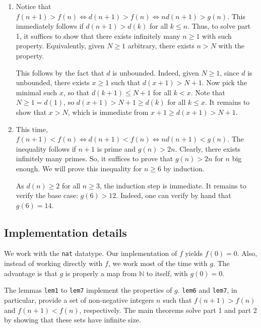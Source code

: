 \documentclass{article}
\newcommand{\N}{\mathbb{N}}
\begin{document}
\begin{enumerate}

\item
Notice that $f(n + 1) > f(n) \iff d(n + 1) > f(n) \iff n d(n + 1) > g(n)$.
This immediately follows if $d(n + 1) > d(k)$ for all $k \leq n$.
Thus, to solve part 1, it suffices to show that there exists infinitely many $n \geq 1$ with such property.
Equivalently, given $N \geq 1$ arbitrary, there exists $n > N$ with the property.

This follows by the fact that $d$ is unbounded.
Indeed, given $N \geq 1$, since $d$ is unbounded, there exists $x \geq 1$ such that $d(x + 1) > N + 1$.
Now pick the minimal such $x$, so that $d(k + 1) \leq N + 1$ for all $k < x$.
Note that $N \geq 1 = d(1)$, so $d(x + 1) > N + 1 \geq d(k)$ for all $k \leq x$.
It remains to show that $x > N$, which is immediate from $x + 1 \geq d(x + 1) > N + 1$.

\item
This time, $f(n + 1) < f(n) \iff d(n + 1) < f(n) \iff n d(n + 1) < g(n)$.
The inequality follows if $n + 1$ is prime and $g(n) > 2n$.
Clearly, there exists infinitely many primes.
So, it suffices to prove that $g(n) > 2n$ for $n$ big enough.
We will prove this inequality for $n \geq 6$ by induction.

As $d(n) \geq 2$ for all $n \geq 3$, the induction step is immediate.
It remains to verify the base case: $g(6) > 12$.
Indeed, one can verify by hand that $g(6) = 14$.

\end{enumerate}



\subsection*{Implementation details}

We work with the \texttt{nat} datatype.
Our implementation of $f$ yields $f(0) = 0$.
Also, instead of working directly with $f$, we work most of the time with $g$.
The advantage is that $g$ is properly a map from $\N$ to itself, with $g(0) = 0$.

The lemmas \texttt{lem1} to \texttt{lem7} implement the properties of $g$.
\texttt{lem6} and \texttt{lem7}, in particular, provide a set of non-negative integers $n$ such that $f(n + 1) > f(n)$ and $f(n + 1) < f(n)$, respectively.
The main theorems solve part 1 and part 2 by showing that these sets have infinite size.
\end{document}
